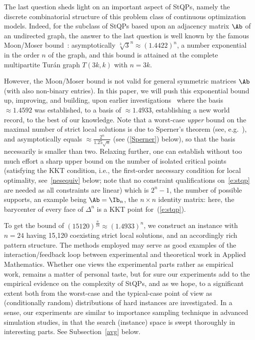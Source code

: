 \documentclass[moor]{informs3}              %
\def\reff#1{(\ref{#1})}
\def\coma#1{{#1}}
\begin{document}
The last question sheds light on an important aspect of StQPs, namely the discrete combinatorial structure of this problem class of continuous optimization models.
Indeed, for the subclass of StQPs based upon an adjacency matrix $\Ab$ of an undirected graph, the answer to the last question is well known by the famous Moon/Moser bound~\cite{Moon65}: asymptotically ${\sqrt[3]{3}}^n\approx (1.4422)^n$, a number exponential in the order $n$ of the graph, and this bound is attained at the
complete multipartite Tur\'an graph $T(3k,k)$ with $n=3k$.

However, the Moon/Moser bound is not valid for general symmetric matrices $\Ab$ (with also non-binary entries). In this paper, we will push this exponential bound up,  improving, and building, upon earlier investigations~\cite{Broo93a} where the basis $\approx 1.4592$ was established, to a basis of $\approx 1.4933$, establishing a new world record, to the best of our knowledge. Note that a worst-case {\em upper} bound on the maximal number of strict {local} solutions is due to Sperner's theorem (see, e.g.~\cite[Section~6.3]{Bomz89a}), and asymptotically equals $\approx \frac{2^n}{1.25\sqrt n}$ (see \reff{Sperner} below), so that the basis necessarily is smaller than two. Relaxing further, one can establish without too much effort a sharp upper bound on the number of isolated critical points (satisfying the KKT condition, \coma{i.e., the first-order necessary condition for local optimality,  see~\eqref{nesequiv} below; note that no constraint qualifications on~\eqref{e:stqp} are needed as all constraints are linear}) which is $2^n-1$, the number of possible supports, an example being $\Ab=\Ib_n$, the $n\times n$ identity matrix: here, the barycenter of every face of $\Delta^n$ is a KKT point for~\reff{e:stqp}.

To get the bound of $(15120)^{\frac n{24}}\approx (1.4933)^n$, we construct an instance with $n=24$ having 15,120 coexisting strict local solutions, and an accordingly rich pattern structure. The methods employed may serve as good examples of the interaction/feedback loop between experimental and theoretical work in Applied Mathematics. Whether one views the experimental parts rather as empirical work, remains a matter of personal taste, but for sure our experiments add to the empirical evidence on the complexity of StQPs, and as we hope, to a significant extent both from the worst-case and the typical-case point of view as (conditionally random) distributions of hard instances are investigated. In a sense, our experiments are similar to importance sampling technique in advanced simulation studies, in that the search (instance) space is swept thoroughly in interesting parts. See Subsection~\ref{avg} below.
\end{document}
